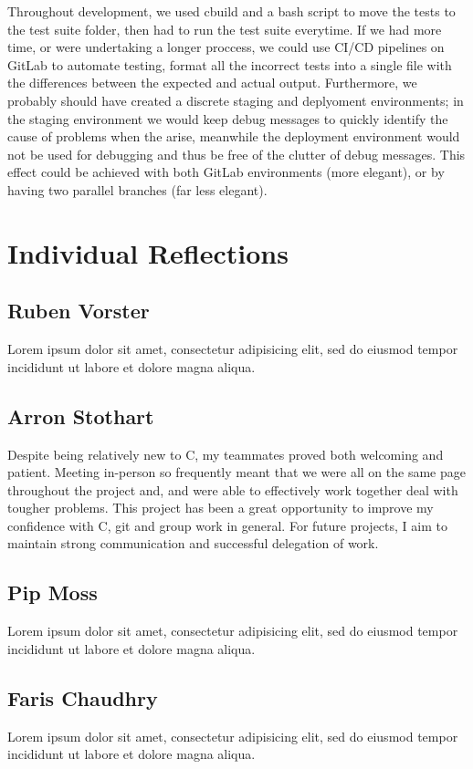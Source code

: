 \documentclass[11pt]{article}
\begin{document}
Throughout development, we used cbuild and a bash script to move the tests to the test suite folder, then had to run the test suite everytime. If we had more time, or were undertaking a longer proccess, we could use CI/CD pipelines on GitLab to automate testing, format all the incorrect tests into a single file with the differences between the expected and actual output. Furthermore, we probably should have created a discrete staging and deplyoment environments; in the staging environment we would keep debug messages to quickly identify the cause of problems when the arise, meanwhile the deployment environment would not be used for debugging and thus be free of the clutter of debug messages. This effect could be achieved with both GitLab environments (more elegant), or by having two parallel branches (far less elegant).

\section{Individual Reflections}
\subsection{Ruben Vorster}
Lorem ipsum dolor sit amet, consectetur adipisicing elit, sed do eiusmod tempor
incididunt ut labore et dolore magna aliqua.
\subsection{Arron Stothart}
Despite being relatively new to C, my teammates proved both welcoming and patient. Meeting in-person so frequently meant that we were all on the same page throughout the project and, and were able to effectively work together deal with tougher problems. This project has been a great opportunity to improve my confidence with C, git and group work in general. For future projects, I aim to maintain strong communication and successful delegation of work.
\subsection{Pip Moss}
Lorem ipsum dolor sit amet, consectetur adipisicing elit, sed do eiusmod tempor
incididunt ut labore et dolore magna aliqua.
\subsection{Faris Chaudhry}
Lorem ipsum dolor sit amet, consectetur adipisicing elit, sed do eiusmod tempor
incididunt ut labore et dolore magna aliqua.
\end{document}
